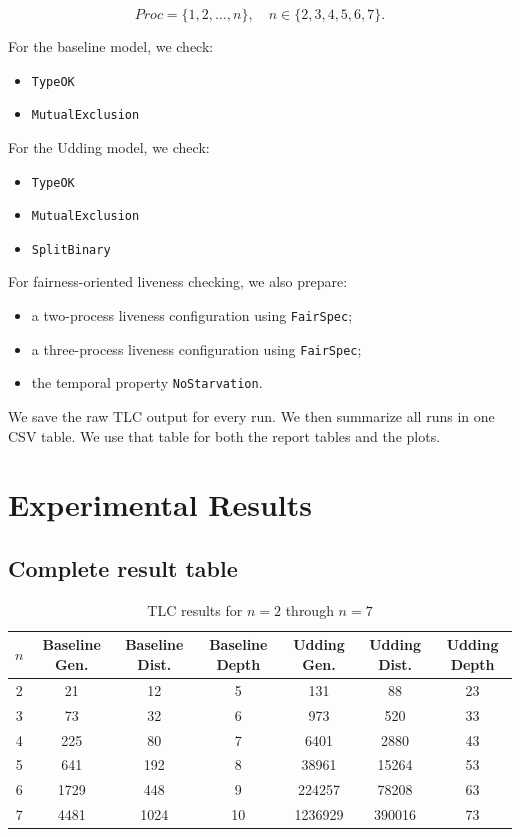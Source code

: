 \documentclass[11pt]{article}
\begin{document}
\[
Proc = \{1,2,\dots,n\}, \quad n \in \{2,3,4,5,6,7\}.
\]

For the baseline model, we check:

\begin{itemize}
  \item \texttt{TypeOK}
  \item \texttt{MutualExclusion}
\end{itemize}

For the Udding model, we check:

\begin{itemize}
  \item \texttt{TypeOK}
  \item \texttt{MutualExclusion}
  \item \texttt{SplitBinary}
\end{itemize}

For fairness-oriented liveness checking, we also prepare:

\begin{itemize}
  \item a two-process liveness configuration using \texttt{FairSpec};
  \item a three-process liveness configuration using \texttt{FairSpec};
  \item the temporal property \texttt{NoStarvation}.
\end{itemize}

We save the raw TLC output for every run. We then summarize all runs in one CSV table. We use that table for both the report tables and the plots.

\section{Experimental Results}

\subsection{Complete result table}

\begin{table}[H]
\centering
\caption{TLC results for $n=2$ through $n=7$}
\begin{tabular}{ccccccc}
\toprule
$n$ & Baseline Gen. & Baseline Dist. & Baseline Depth & Udding Gen. & Udding Dist. & Udding Depth \\
\midrule
2 & 21 & 12 & 5 & 131 & 88 & 23 \\
3 & 73 & 32 & 6 & 973 & 520 & 33 \\
4 & 225 & 80 & 7 & 6401 & 2880 & 43 \\
5 & 641 & 192 & 8 & 38961 & 15264 & 53 \\
6 & 1729 & 448 & 9 & 224257 & 78208 & 63 \\
7 & 4481 & 1024 & 10 & 1236929 & 390016 & 73 \\
\bottomrule
\end{tabular}
\end{table}
\end{document}
